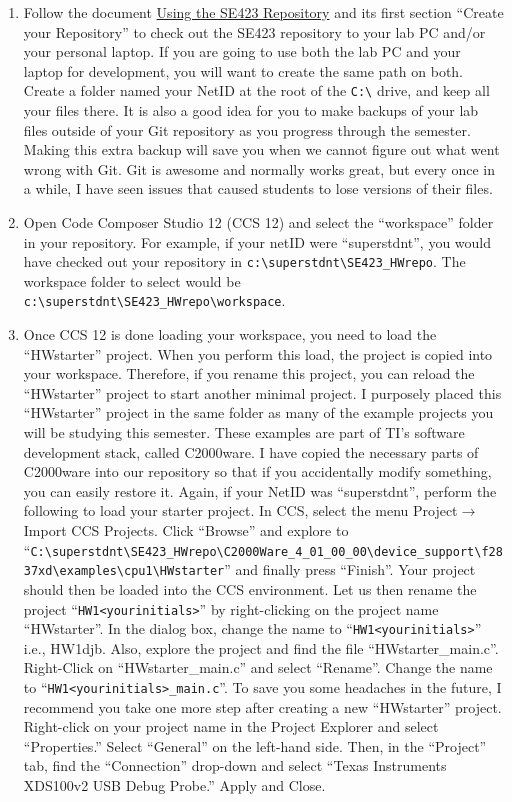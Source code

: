 \documentclass[11pt]{article}
\begin{document}
\begin{enumerate}
        \item Follow the document \href{http://coecsl.ece.illinois.edu/se423/Using the SE423 Repository.pdf}{Using the SE423 Repository} and its first section “Create your Repository” to check out the SE423 repository to your lab PC and/or your personal laptop. If you are going to use both the lab PC and your laptop for development, you will want to create the same path on both. Create a folder named your NetID at the root of the \verb|C:\| drive, and keep all your files there. It is also a good idea for you to make backups of your lab files outside of your Git repository as you progress through the semester. Making this extra backup will save you when we cannot figure out what went wrong with Git. Git is awesome and normally works great, but every once in a while, I have seen issues that caused students to lose versions of their files.
    \item Open Code Composer Studio 12 (CCS 12) and select the “workspace” folder in your repository. For example, if your netID were “superstdnt”, you would have checked out your repository in \lstinline|c:\superstdnt\SE423_HWrepo|. The workspace folder to select would be \lstinline{c:\superstdnt\SE423_HWrepo\workspace}.
    \item Once CCS 12 is done loading your workspace, you need to load the “HWstarter” project. When you perform this load, the project is copied into your workspace. Therefore, if you rename this project, you can reload the “HWstarter” project to start another minimal project. I purposely placed this “HWstarter” project in the same folder as many of the example projects you will be studying this semester. These examples are part of TI's software development stack, called C2000ware. I have copied the necessary parts of C2000ware into our repository so that if you accidentally modify something, you can easily restore it. Again, if your NetID was “superstdnt”, perform the following to load your starter project. In CCS, select the menu Project$\rightarrow$Import CCS Projects. Click “Browse” and explore to “\lstinline{C:\superstdnt\SE423_HWrepo\C2000Ware_4_01_00_00\device_support\f2837xd\examples\cpu1\HWstarter}” and finally press “Finish”. Your project should then be loaded into the CCS environment. Let us then rename the project “\lstinline|HW1<yourinitials>|” by right-clicking on the project name “HWstarter”. In the dialog box, change the name to “\lstinline|HW1<yourinitials>|” i.e., HW1djb. Also, explore the project and find the file “HWstarter\_main.c”. Right-Click on “HWstarter\_main.c” and select “Rename”. Change the name to “\lstinline|HW1<yourinitials>_main.c|”. To save you some headaches in the future, I recommend you take one more step after creating a new “HWstarter” project. Right-click on your project name in the Project Explorer and select “Properties.”  Select “General” on the left-hand side. Then, in the “Project” tab, find the “Connection” drop-down and select “Texas Instruments XDS100v2 USB Debug Probe.” Apply and Close.

\end{enumerate}
\end{document}
